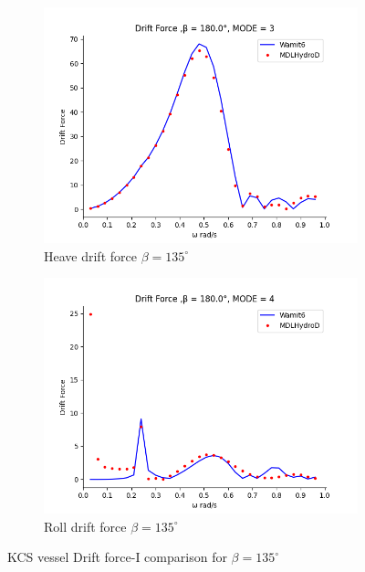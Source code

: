 \begin{figure}[H]
\begin{subfigure}[b]{0.45\textwidth}
        \includegraphics[width=\textwidth]{plots/kcs/drift/DrtFrc_12MODE_3.png}
        \caption{Heave drift force $\beta = 135^{\circ}$}
    \end{subfigure}
    \begin{subfigure}[b]{0.45\textwidth}
        \includegraphics[width=\textwidth]{plots/kcs/drift/DrtFrc_12MODE_4.png}
        \caption{Roll drift force $\beta = 135^{\circ}$}
    \end{subfigure}
    \vspace{5pt}%
    \caption{KCS vessel Drift force-I comparison for $\beta= 135^{\circ}$}
    \label{fig:kcs_drift_135_1}
\end{figure}

